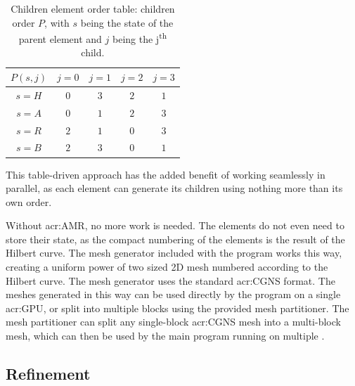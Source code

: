 \begin{table}[H]
    \begin{center}
        \begin{tabular}{ c | c c c c} 
            \(P( s, j )\) & \(j = 0\) & \(j = 1\) & \(j = 2\) & \(j = 3\)  \\
            \hline
            \(s = H\) & \textcolor{vs_red}{\(0\)} & \textcolor{vs_red}{\(3\)} & \textcolor{vs_red}{\(2\)} & \textcolor{vs_red}{\(1\)} \\ 
            \(s = A\) & \textcolor{vs_blue}{\(0\)} & \textcolor{vs_blue}{\(1\)} & \textcolor{vs_blue}{\(2\)} & \textcolor{vs_blue}{\(3\)} \\
            \(s = R\) & \textcolor{vs_teal}{\(2\)} & \textcolor{vs_teal}{\(1\)} & \textcolor{vs_teal}{\(0\)} & \textcolor{vs_teal}{\(3\)} \\
            \(s = B\) & \textcolor{vs_plum}{\(2\)} & \textcolor{vs_plum}{\(3\)} & \textcolor{vs_plum}{\(0\)} & \textcolor{vs_plum}{\(1\)} \\
        \end{tabular}
        
        \caption{Children element order table: children order \(P\), with \(s\) being the state of the parent element and \(j\) being the j\textsuperscript{th} child.}\label{table:children_ordering}
    \end{center}
\end{table}

This table-driven approach has the added benefit of working seamlessly in parallel, as each element
can generate its children using nothing more than its own order.

Without \acrlong{acr:AMR}, no more work is needed. The elements do not even need to store their
state, as the compact numbering of the elements is the result of the Hilbert curve. The mesh
generator included with the program works this way, creating a uniform power of two sized 2D mesh
numbered according to the Hilbert curve. The mesh generator uses the standard \acrshort{acr:CGNS}
format. The meshes generated in this way can be used directly by the program on a single
\acrshort{acr:GPU}, or split into multiple blocks using the provided mesh partitioner. The mesh
partitioner can split any single-block \acrshort{acr:CGNS} mesh into a multi-block mesh, which can
then be used by the main program running on multiple .

\subsection{Refinement}\label{section:load_balancing:hilbert_curve:refinement}


